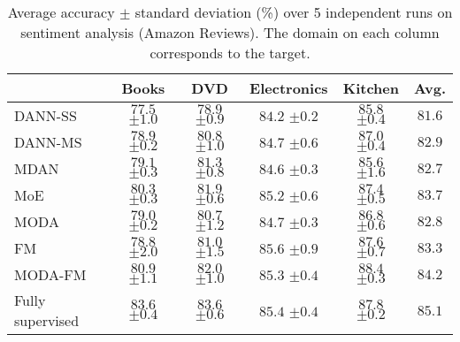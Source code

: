 \begin{table}[]
    \centering
    \begin{tabular}{l|cccc:c}
        & Books           & DVD             & Electronics     & Kitchen  & Avg. \\ \hline
        DANN-SS \cite{Ganin2015} & $ 77.5 $ \tiny{$ \pm 1.0 $} & $ 78.9 $ \tiny{$ \pm 0.9 $} & $ 84.2 $ \tiny{$ \pm 0.2 $} & $ 85.8 $ \tiny{$ \pm 0.4 $} & $81.6$ \\
        DANN-MS \cite{Ganin2015} & $ 78.9 $ \tiny{$ \pm 0.2 $} & $ 80.8 $ \tiny{$ \pm 1.0 $} & $ 84.7 $ \tiny{$ \pm 0.6 $} & $ 87.0 $ \tiny{$ \pm 0.4 $} & $82.9$ \\
        MDAN \cite{Zhao2018}     & $ 79.1 $ \tiny{$ \pm 0.3 $} & $ 81.3 $ \tiny{$ \pm 0.8 $} & $ 84.6 $ \tiny{$ \pm 0.3 $} & $ 85.6 $ \tiny{$ \pm 1.6 $} & $82.7$ \\
        MoE \cite{Guo2018}      & $ 80.3 $ \tiny{$ \pm 0.3 $} & $ 81.9 $ \tiny{$ \pm 0.6 $} & $ 85.2 $ \tiny{$ \pm 0.6 $} & $ 87.4 $ \tiny{$ \pm 0.5 $} & $83.7$\\ \hline
        MODA     & $ 79.0 $ \tiny{$ \pm 0.2 $} & $ 80.7 $ \tiny{$ \pm 1.2 $} & $ 84.7 $ \tiny{$ \pm 0.3 $} & $ 86.8 $ \tiny{$ \pm 0.6 $} & $82.8$\\
        FM         & $ 78.8 $ \tiny{$ \pm 2.0 $} & $ 81.0 $ \tiny{$ \pm 1.5 $} & $\boldsymbol{85.6}$ \tiny{$\pm 0.9 $} & $ 87.6 $ \tiny{$ \pm 0.7 $} & $83.3$\\
        MODA-FM    & $\boldsymbol{80.9}$ \tiny{$\pm 1.1$} & $\boldsymbol{82.0}$ \tiny{$\pm 1.0$} & $ 85.3 $ \tiny{$ \pm 0.4 $} & $\boldsymbol{88.4}$ \tiny{$\pm 0.3$} & $\boldsymbol{84.2}$\\ \hline
        Fully supervised & $ 83.6 $ \tiny{$ \pm 0.4 $} & $ 83.6 $ \tiny{$ \pm 0.6 $} & $ 85.4 $ \tiny{$ \pm 0.4 $} & $ 87.8 $ \tiny{$ \pm 0.2 $} & $85.1$
    \end{tabular}
    \caption{Average accuracy $\pm$ standard deviation (\%) over 5 independent runs on sentiment analysis (Amazon Reviews). The domain on each column corresponds to the target.}
    \label{tab:amazon_acc}
\end{table}

